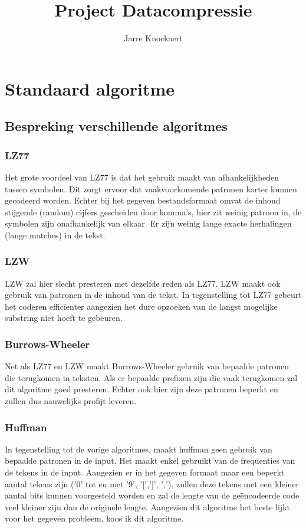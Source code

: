 \documentclass[11pt, a4paper]{article}
\begin{document}
	\title{Project Datacompressie}
	\author{Jarre Knockaert}
	\maketitle
\thispagestyle{empty}
\newpage
{}
\section{Standaard algoritme}
\subsection{Bespreking verschillende algoritmes}
\subsubsection{LZ77}
Het grote voordeel van LZ77 is dat het gebruik maakt van afhankelijkheden tussen symbolen. Dit zorgt ervoor dat vaakvoorkomende patronen korter kunnen gecodeerd worden. Echter bij het gegeven bestandsformaat omvat de inhoud stijgende (random) cijfers gescheiden door komma's, hier zit weinig patroon in, de symbolen zijn onafhankelijk van elkaar. Er zijn weinig lange exacte herhalingen (lange matches) in de tekst. 

\subsubsection{LZW}
LZW zal hier slecht presteren met dezelfde reden als LZ77. LZW maakt ook gebruik van patronen in de inhoud van de tekst. In tegenstelling tot LZ77 gebeurt het coderen effic\"{i}enter aangezien het dure opzoeken van de langst mogelijke substring niet hoeft te gebeuren. 

\subsubsection{Burrows-Wheeler}
Net als LZ77 en LZW maakt Burrows-Wheeler gebruik van bepaalde patronen die terugkomen in teksten. Als er bepaalde prefixen zijn die vaak terugkomen zal dit algoritme goed presteren. Echter ook hier zijn deze patronen beperkt en zullen dus nauwelijks profijt leveren. 

\subsubsection{Huffman}
In tegenstelling tot de vorige algoritmes, maakt huffman geen gebruik van bepaalde patronen in de input. Het maakt enkel gebruikt van de frequenties van de tekens in de input. Aangezien er in het gegeven formaat maar een beperkt aantal tekens zijn ('0' tot en met '9', '[',']', ','), zullen deze tekens met een kleiner aantal bits kunnen voorgesteld worden en zal de lengte van de ge\"{e}ncodeerde code veel kleiner zijn dan de originele lengte. Aangezien dit algoritme het beste lijkt voor het gegeven probleem, koos ik dit algoritme. 
\end{document}
